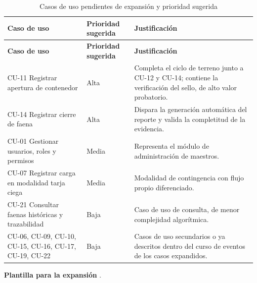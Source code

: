 {\estilotabla
\begin{longtable}{L{0.34\textwidth} C{0.16\textwidth} L{0.44\textwidth}}

\caption{Casos de uso pendientes de expansión y prioridad sugerida}
\label{tab:cu_pendientes}
\\

\toprule
\textbf{Caso de uso} & \textbf{Prioridad sugerida} & \textbf{Justificación} \\
\midrule
\endfirsthead

\toprule
\textbf{Caso de uso} & \textbf{Prioridad sugerida} & \textbf{Justificación} \\
\midrule
\endhead

CU-11 Registrar apertura de contenedor & Alta &
Completa el ciclo de terreno junto a CU-12 y CU-14; contiene la verificación del sello, de alto
valor probatorio. \\
\midrule

CU-14 Registrar cierre de faena & Alta &
Dispara la generación automática del reporte y valida la completitud de la evidencia. \\
\midrule

CU-01 Gestionar usuarios, roles y permisos & Media &
Representa el módulo de administración de maestros. \\
\midrule

CU-07 Registrar carga en modalidad tarja ciega & Media &
Modalidad de contingencia con flujo propio diferenciado. \\
\midrule

CU-21 Consultar faenas históricas y trazabilidad & Baja &
Caso de uso de consulta, de menor complejidad algorítmica. \\
\midrule

CU-06, CU-09, CU-10, CU-15, CU-16, CU-17, CU-19, CU-22 & Baja &
Casos de uso secundarios o ya descritos dentro del curso de eventos de los casos expandidos. \\

\bottomrule

\end{longtable}
}

\textbf{Plantilla para la expansión} .

